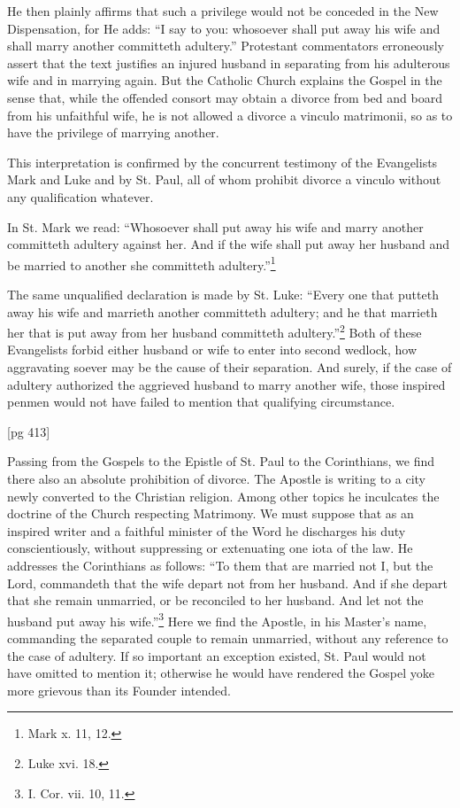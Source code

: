 He then plainly affirms that such a privilege
would not be conceded in the New Dispensation,
for He adds: “I say to you: whosoever shall
put away his wife and shall marry another committeth
adultery.” Protestant commentators erroneously
assert that the text justifies an injured
husband in separating from his adulterous wife
and in marrying again. But the Catholic Church
explains the Gospel in the sense that, while the
offended consort may obtain a divorce from bed
and board from his unfaithful wife, he is not allowed
a divorce a vinculo matrimonii, so as to
have the privilege of marrying another.

This interpretation is confirmed by the concurrent
testimony of the Evangelists Mark and Luke
and by St. Paul, all of whom prohibit divorce a
vinculo without any qualification whatever.

In St. Mark we read: “Whosoever shall put
away his wife and marry another committeth
adultery against her. And if the wife shall put
away her husband and be married to another she
committeth adultery.”\footnote{Mark x. 11, 12.}

The same unqualified declaration is made by
St. Luke: “Every one that putteth away his wife
and marrieth another committeth adultery; and
he that marrieth her that is put away from her
husband committeth adultery.”\footnote{Luke xvi. 18.} Both of these
Evangelists forbid either husband or wife to enter
into second wedlock, how aggravating soever
may be the cause of their separation. And surely,
if the case of adultery authorized the aggrieved
husband to marry another wife, those inspired
penmen would not have failed to mention that
qualifying circumstance.

[pg 413]

Passing from the Gospels to the Epistle of St.
Paul to the Corinthians, we find there also an
absolute prohibition of divorce. The Apostle
is writing to a city newly converted to the Christian
religion. Among other topics he inculcates
the doctrine of the Church respecting Matrimony.
We must suppose that as an inspired writer and
a faithful minister of the Word he discharges his
duty conscientiously, without suppressing or extenuating
one iota of the law. He addresses the
Corinthians as follows: “To them that are married
not I, but the Lord, commandeth that the
wife depart not from her husband. And if she
depart that she remain unmarried, or be reconciled
to her husband. And let not the husband
put away his wife.”\footnote{I.
Cor. vii. 10, 11.} Here we find the Apostle,
in his Master's name, commanding the separated
couple to remain unmarried, without any reference
to the case of adultery. If so important an
exception existed, St. Paul would not have omitted
to mention it; otherwise he would have rendered
the Gospel yoke more grievous than its
Founder intended.

